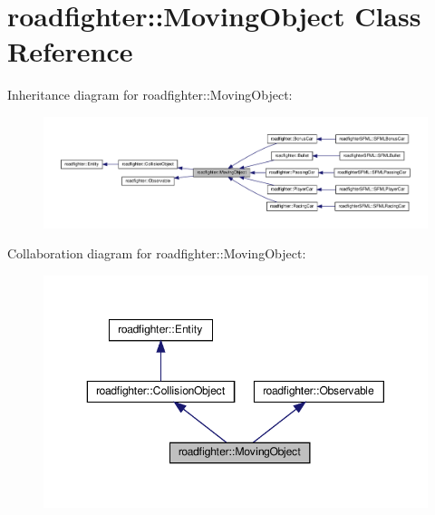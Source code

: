 \hypertarget{classroadfighter_1_1MovingObject}{}\section{roadfighter\+:\+:Moving\+Object Class Reference}
\label{classroadfighter_1_1MovingObject}


Inheritance diagram for roadfighter\+:\+:Moving\+Object\+:
\nopagebreak
\begin{figure}[H]
\begin{center}
\leavevmode
\includegraphics[width=350pt]{classroadfighter_1_1MovingObject__inherit__graph}
\end{center}
\end{figure}


Collaboration diagram for roadfighter\+:\+:Moving\+Object\+:
\nopagebreak
\begin{figure}[H]
\begin{center}
\leavevmode
\includegraphics[width=350pt]{classroadfighter_1_1MovingObject__coll__graph}
\end{center}
\end{figure}

